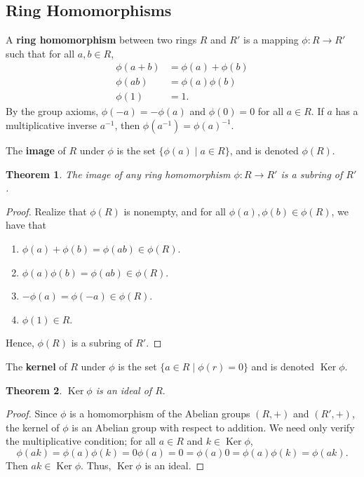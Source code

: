 \documentclass[11pt]{article}
\newtheorem{theorem}{Theorem}
\newcommand{\Ker}{\operatorname{Ker}}
\begin{document}
\subsection{Ring Homomorphisms}

A \textbf{ring homomorphism} between two rings $R$ and $R'$ is a mapping $\phi : R \to R'$ such that for all $a, b \in R$,
\begin{align*}
	\phi(a + b) &= \phi(a) + \phi(b) \\
	   \phi(ab) &= \phi(a) \phi(b) \\
	   	\phi(1) &= 1.
\end{align*}
By the group axioms, $\phi(-a) = -\phi(a)$ and $\phi(0) = 0$ for all $a \in R$. If $a$ has a multiplicative inverse $a^{-1}$, then $\phi(a^{-1}) = \phi(a)^{-1}$.

The \textbf{image} of $R$ under $\phi$ is the set $\{ \phi(a) \mid a \in R \}$, and is denoted $\phi(R)$.

\begin{adjustwidth}{0.5cm}{}
	\begin{theorem}
		The image of any ring homomorphism $\phi : R \to R'$ is a subring of $R'$.
	\end{theorem}
	\begin{proof}
		Realize that $\phi(R)$ is nonempty, and for all $\phi(a), \phi(b) \in \phi(R)$, we have that 
		\begin{enumerate}
			\item $\phi(a) + \phi(b) = \phi(ab) \in \phi(R)$.
			\item $\phi(a) \phi(b) = \phi(ab) \in \phi(R)$.
			\item $-\phi(a) = \phi(-a) \in \phi(R)$.
			\item $\phi(1) \in R$.
		\end{enumerate}	
		Hence, $\phi(R)$ is a subring of $R'$.
	\end{proof}
\end{adjustwidth}

\newpage

The \textbf{kernel} of $R$ under $\phi$ is the set $\{ a \in R \mid \phi(r) = 0 \}$ and is denoted $\Ker \phi$.

\begin{adjustwidth}{0.5cm}{}
	\begin{theorem}
		$\Ker \phi$ is an ideal of $R.$
	\end{theorem}
	\begin{proof}
		Since $\phi$ is a homomorphism of the Abelian groups $(R, +)$ and $(R', +)$, the kernel of $\phi$ is an Abelian group with respect to addition. We need only verify the multiplicative condition; for all $a \in R$ and $k \in \Ker \phi$,
		\[
			\phi(ak) = \phi(a) \phi(k) = 0 \phi(a) = 0 = \phi(a) 0 = \phi(a) \phi(k) = \phi(ak).
		\]
		Then $ak \in \Ker \phi$. Thus, $\Ker \phi$ is an ideal.
	\end{proof}
\end{adjustwidth}
\end{document}

